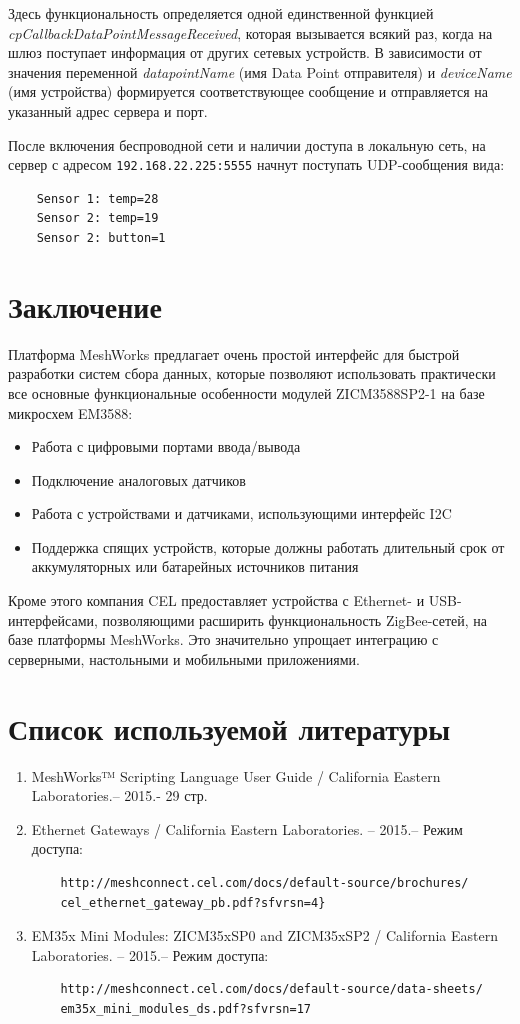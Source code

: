 \documentclass[11pt]{article}
\begin{document}
Здесь функциональность определяется одной единственной функцией 
\emph{cpCallbackDataPointMessageReceived}, которая вызывается всякий раз, когда 
на шлюз поступает информация от других сетевых устройств. В зависимости от значения
переменной \emph{datapointName} (имя Data Point отправителя) и \emph{deviceName} (имя 
устройства) формируется соответствующее сообщение и отправляется на указанный адрес
сервера и порт.

После включения беспроводной сети и наличии доступа в локальную сеть, на сервер с адресом
\texttt{192.168.22.225:5555} начнут поступать UDP-сообщения вида:
\begin{verbatim}
    Sensor 1: temp=28
    Sensor 2: temp=19
    Sensor 2: button=1
\end{verbatim}
\newpage %
\section{Заключение}
Платформа MeshWorks предлагает очень простой интерфейс для быстрой разработки систем
сбора данных, которые позволяют использовать практически все основные функциональные
особенности модулей ZICM3588SP2-1 на базе микросхем EM3588:
\begin{itemize}
 \item Работа с цифровыми портами ввода/вывода
 \item Подключение аналоговых датчиков
 \item Работа с устройствами и датчиками, использующими интерфейс I2C
 \item Поддержка спящих устройств, которые должны работать длительный срок от
 аккумуляторных или батарейных источников питания
\end{itemize}
Кроме этого компания CEL предоставляет устройства с Ethernet- и USB-интерфейсами, 
позволяющими расширить функциональность ZigBee-сетей, на базе платформы MeshWorks.
Это значительно упрощает интеграцию с серверными, настольными и мобильными приложениями.

\section{Список используемой литературы}

\begin{enumerate}
    \item MeshWorks™ Scripting Language User Guide / California Eastern Laboratories.--
    2015.- 29 стр.
    \item Ethernet Gateways / California Eastern Laboratories. -- 2015.– Режим доступа:
    \begin{verbatim}
    http://meshconnect.cel.com/docs/default-source/brochures/
    cel_ethernet_gateway_pb.pdf?sfvrsn=4}
    \end{verbatim}
    \item EM35x Mini Modules: ZICM35xSP0 and ZICM35xSP2 / California Eastern Laboratories. -- 2015.– Режим доступа:
    \begin{verbatim}
    http://meshconnect.cel.com/docs/default-source/data-sheets/
    em35x_mini_modules_ds.pdf?sfvrsn=17
    \end{verbatim}
\end{enumerate}
\end{document}

